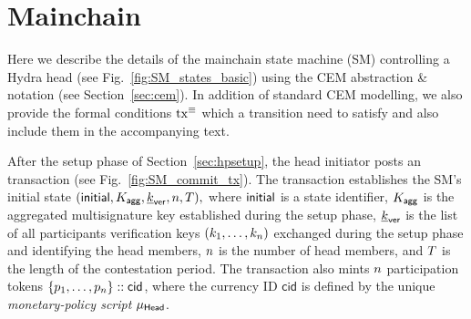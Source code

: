 \section{Mainchain}\label{sec:mainchain}

Here we describe the details of the mainchain state machine (SM) controlling a
Hydra head (see Fig.~\ref{fig:SM_states_basic}) using the CEM abstraction \&
notation (see Section~\ref{sec:cem}). In addition of standard CEM modelling, we
also provide the formal conditions $\mathrm{tx}^\equiv$ which a transition need to
satisfy and also include them in the accompanying text.




 After the setup phase of Section~\ref{sec:hpsetup},
the head initiator posts an \mtxInit{} transaction (see
Fig.~\ref{fig:SM_commit_tx}). The \mtxInit{} transaction establishes the SM's
initial state \( (\mathsf{initial},K_{\mathsf{agg}},\underline{k}_{\mathsf{ver}},n,T), \) where $\mathsf{initial}$ is
a state identifier, $K_{\mathsf{agg}}$ is the aggregated multisignature key established
during the setup phase, $\underline{k}_{\mathsf{ver}}$ is the list of all participants verification
keys $(k_1,\ldots,k_n)$ exchanged during the setup phase and identifying the
head members, $n$ is the number of head members, and $T$ is the length of
the contestation period. The \mtxInit{} transaction also mints $n$
participation tokens $\{p_1,\ldots,p_n\} :: \mathsf{cid}$, where the currency
ID $\mathsf{cid}$ is defined by the unique \emph{monetary-policy script}
$\mu_\mathsf{Head}$.

